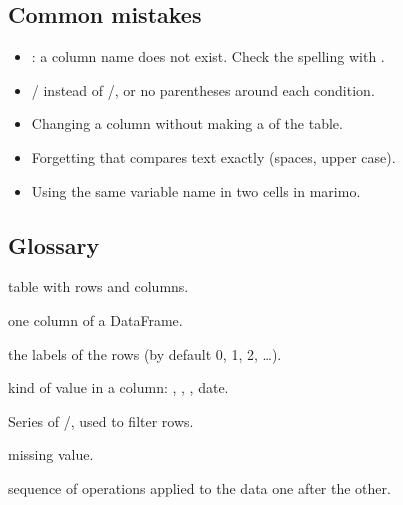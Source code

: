 \documentclass[11pt,a4paper]{article}
\begin{document}
\subsection*{Common mistakes}

\begin{itemize}
  \item {}: a column name does not exist. Check the
        spelling with .
  \item {}/ instead of \code{\&}/\code{|}, or no
        parentheses around each condition.
  \item Changing a column without making a  of the table.
  \item Forgetting that \code{==} compares text exactly (spaces, upper
        case).
  \item Using the same variable name in two cells in marimo.
\end{itemize}

\subsection*{Glossary}

\begin{description}[leftmargin=2.6cm, labelwidth=2.4cm, font=\normalfont\bfseries]
  \item[DataFrame] table with rows and columns.
  \item[Series] one column of a DataFrame.
  \item[index] the labels of the rows (by default 0, 1, 2, \dots).
  \item[data type] kind of value in a column: , , , date.
  \item[mask] Series of /, used to filter rows.
  \item[NaN] missing value.
  \item[pipeline] sequence of operations applied to the data one after the other.
\end{description}
\end{document}
